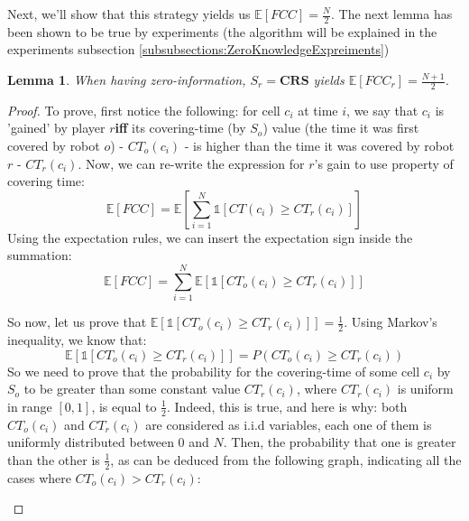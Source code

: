\documentclass[a4paper,10pt]{article}
\newtheorem{lemma}[theorem]{Lemma}
\newcommand\rob{\ensuremath{r}\xspace}
\newcommand\opp{\ensuremath{o}\xspace}
\newcommand{\fcc}{\ensuremath{FCC}\xspace}
\begin{document}
Next, we'll show that this strategy yields us $\mathbb{E}[\fcc]=\frac{N}{2}$. The next lemma has been shown to be true by experiments (the algorithm will be explained in the experiments subsection \ref{subsubsections:ZeroKnowledgeExpreiments})

\begin{lemma}\label{lemmas:ZeroKnowledgeEFCC}
When having zero-information, $S_{\rob}=\textbf{CRS}$ yields $\mathbb{E}[\fcc_{\rob}]=\frac{N+1}{2}$.
\end{lemma}

\begin{proof}
To prove, first notice the following: for cell $c_i$ at time $i$, we say that $c_i$ is 'gained' by player \rob \textbf{iff} its covering-time (by $S_o$) value (the time it was first covered by robot \opp) - ${CT}_{\opp}(c_i)$ - is higher than the time it was covered by robot $\rob$ - ${CT}_{\rob}(c_i)$.
Now, we can re-write the expression for \rob's gain to use property of covering time: \[\mathbb{E}[\fcc]=\mathbb{E}\left[\sum_{i=1}^{N}{\mathds{1}\left[CT\left(c_i\right)\geq {CT}_{\rob}(c_i)\right]}\right]\]
Using the expectation rules, we can insert the expectation sign inside the summation: \[\mathbb{E}[\fcc]=\sum_{i=1}^{N}{\mathbb{E}\left[\mathds{1}\left[{CT}_{\opp}(c_i)\geq {CT}_{\rob}(c_i)\right]\right]}\]

So now, let us prove that $\mathbb{E}\left[\mathds{1}\left[{CT}_{\opp}(c_i)\geq {CT}_{\rob}(c_i)\right]\right]=\frac{1}{2}$. 
Using Markov's inequality, we know that: \[\mathbb{E}\left[\mathds{1}\left[{CT}_{\opp}(c_i)\geq {CT}_{\rob}(c_i)\right]\right]=P\left({CT}_{\opp}(c_i)\geq {CT}_{\rob}(c_i)\right)\]
So we need to prove that the probability for the covering-time of some cell $c_i$ by $S_{\opp}$ to be greater than some constant value ${CT}_{\rob}(c_i)$, where ${CT}_{\rob}(c_i)$ is uniform in range $[0,1]$, is equal to $\frac{1}{2}$.
Indeed, this is true, and here is why: both ${CT}_{\opp}(c_i)$ and ${CT}_{\rob}(c_i)$ are considered as i.i.d variables, each one of them is uniformly distributed between $0$ and $N$. Then, the probability that one is greater than the other is $\frac{1}{2}$, as can be deduced from the following graph, indicating all the cases where ${CT}_{\opp}(c_i) > {CT}_{\rob}(c_i)$:

  
     \begin{figure}[thpb]
      \centering
\end{figure}
\end{proof}
\end{document}
